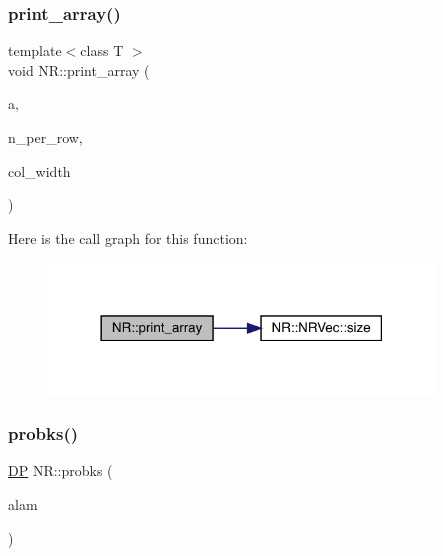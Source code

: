 \mbox{\label{namespaceNR_abdbf6d4f445b801d09e550474f942b00}} 
\subsubsection{\texorpdfstring{print\_array()}{print\_array()}}
{\footnotesize\ttfamily template$<$class T $>$ \\
void N\+R\+::print\+\_\+array (\begin{DoxyParamCaption}\item[{const \mbox{\hyperlink{classNR_1_1NRVec}{N\+R\+Vec}}$<$ T $>$ \&}]{a,  }\item[{const int}]{n\+\_\+per\+\_\+row,  }\item[{const int}]{col\+\_\+width }\end{DoxyParamCaption})}

Here is the call graph for this function\+:
\nopagebreak
\begin{figure}[H]
\begin{center}
\leavevmode
\includegraphics[width=290pt]{da/d46/namespaceNR_abdbf6d4f445b801d09e550474f942b00_cgraph}
\end{center}
\end{figure}
\mbox{\label{namespaceNR_a728a822ccbd90f47b7e83d9186ca631a}} 
\subsubsection{\texorpdfstring{probks()}{probks()}}
{\footnotesize\ttfamily \mbox{\hyperlink{namespaceNR_af6ff762dd605ff477b8e52387253a02a}{DP}} N\+R\+::probks (\begin{DoxyParamCaption}\item[{const \mbox{\hyperlink{namespaceNR_af6ff762dd605ff477b8e52387253a02a}{DP}}}]{alam }\end{DoxyParamCaption})}

\mbox{\label{namespaceNR_a2d127644657046b9b67b8189fd79d51c}} 

